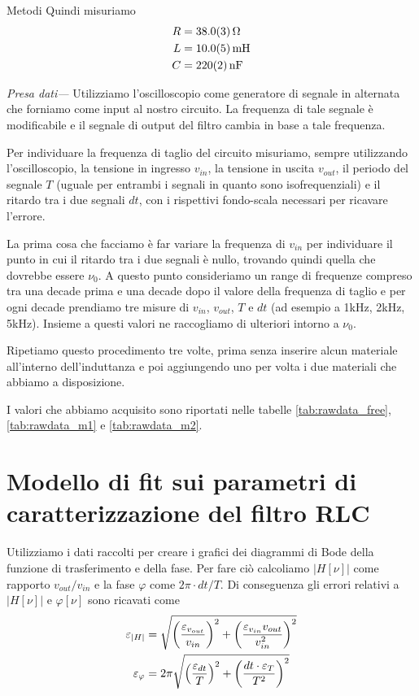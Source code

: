 \documentclass[
    prl,
    floatfix,
    reprint, 
    superscriptaddress, 
    altaffilletter, 
    amsmath, 
    amssymb, 
    a4paper]{revtex4-2}
\begin{document}
\begin{methods}{Metodi}
    Quindi misuriamo \begin{align*}
        R &= \SI{38.0+-0.3}{\ohm}        \\
        L &= \SI{10.0+-0.5}{\milli\henry}\\
        C &= \SI{220+-2}{\nano\farad}    
    \end{align*}

    \noindent\textit{Presa dati---} Utilizziamo l'oscilloscopio come generatore di segnale in alternata che forniamo come input al nostro circuito. La frequenza di tale segnale \`e modificabile e il segnale di output del filtro cambia in base a tale frequenza.
    
    Per individuare la frequenza di taglio del circuito misuriamo, sempre utilizzando l'oscilloscopio, la tensione in ingresso $v_{in}$, la tensione in uscita $v_{out}$, il periodo del segnale $T$ (uguale per entrambi i segnali in quanto sono isofrequenziali) e il ritardo tra i due segnali $dt$, con i rispettivi fondo-scala necessari per ricavare l'errore. 

    La prima cosa che facciamo è far variare la frequenza di $v_{in}$ per individuare il punto in cui il ritardo tra i due segnali è nullo, trovando quindi quella che dovrebbe essere $\nu_{0}$. A questo punto consideriamo un range di frequenze compreso tra una decade prima e una decade dopo il valore della frequenza di taglio e per ogni decade prendiamo tre misure di $v_{in}$, $v_{out}$, $T$ e $dt$ (ad esempio a 1kHz, 2kHz, 5kHz). Insieme a questi valori ne raccogliamo di ulteriori intorno a $\nu_{0}$.

    Ripetiamo questo procedimento tre volte, prima senza inserire alcun materiale all'interno dell'induttanza e poi aggiungendo uno per volta i due materiali che abbiamo a disposizione.
    
    I valori che abbiamo acquisito sono riportati nelle tabelle \ref{tab:rawdata_free}, \ref{tab:rawdata_m1} e \ref{tab:rawdata_m2}.
        
\end{methods}


\section*{Modello di fit sui parametri di caratterizzazione del filtro RLC}
Utilizziamo i dati raccolti per creare i grafici dei diagrammi di Bode della funzione di trasferimento e della fase. Per fare ciò calcoliamo $\big|H[\nu]\big|$ come rapporto $v_{out}/v_{in}$ e la fase $\varphi$ come $2\pi \cdot dt / T$. Di conseguenza gli errori relativi a $\big|H[\nu]\big|$ e $\varphi[\nu]$ sono ricavati come 
\begin{align*}
    \varepsilon_{|H|} &= \sqrt{\left(\frac{\varepsilon_{v_{out}}}{v_{in}}\right)^2+\left(\frac{\varepsilon_{v_{in}}v_{out}}{v_{in}^2}\right)^2}\\
    \varepsilon_{\varphi} &= 2\pi \sqrt{\left(\frac{\varepsilon_{dt}}{T}\right)^2 + \left(\frac{dt\cdot\varepsilon_{T}}{T^2}\right)^2}
\end{align*}
\end{document}
